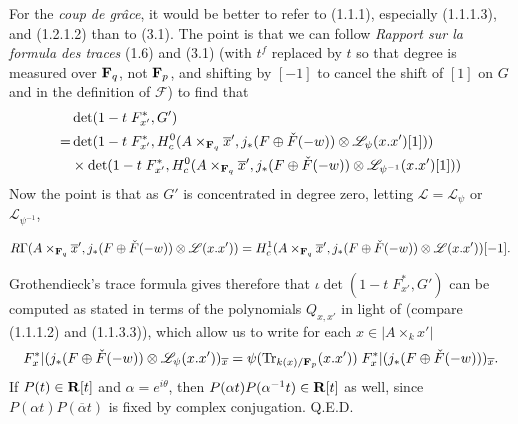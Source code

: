 \documentclass[deligne.tex]{subfiles}
\begin{document}
For the \emph{coup de grâce}, it would be better to refer to (1.1.1),
especially (1.1.1.3), and (1.2.1.2) than to (3.1). The point is that we
can follow \emph{Rapport sur la formula des traces} (1.6) and (3.1) (with
$t^f$ replaced by $t$ so that degree is measured over $\mathbf{F}_q$, not $\mathbf{F}_p$,
and shifting by $[-1]$ to cancel the shift of $[1]$ on $G$ and
in the definition of $\mathscr F$)
to find that
\begin{align*}
	&\det(1-t\; F_{x'}^*,G') \\
	=&\det(1-t\; F_{x'}^*,H_c^0(A\times_{\mathbf{F}_q}\overline x',j_*(F\oplus\check F(-w))\otimes\mathscr L_\psi(x.x')[1])) \\
	&\times\det(1-t\; F_{x'}^*,H_c^0(A\times_{\mathbf{F}_q}\overline x',j_*(F\oplus\check F(-w))\otimes\mathscr L_{\psi^{-1}}(x.x')[1]))
\end{align*}
Now the point is that as $G'$ is concentrated in degree zero,
letting $\mathscr L=\mathscr L_\psi$ or $\mathscr L_{\psi^{-1}}$,
\begin{ceqn}\begin{equation*}
	R\Gamma(A\times_{\mathbf{F}_q}\overline x',j_*(F\oplus\check F(-w))\otimes\mathscr L(x.x'))
	=H^1_c(A\times_{\mathbf{F}_q}\overline x',j_*(F\oplus\check F(-w))\otimes\mathscr L(x.x'))[-1].
\end{equation*}\end{ceqn}
Grothendieck's trace formula gives therefore that
$\iota\det(1-t\; F_{x'}^*,G')$ can be computed as stated in terms of the
polynomials $Q_{x,x'}$ in light of \cite[1.7.6 \& 1.7.7]{Trig}
(compare (1.1.1.2) and (1.1.3.3)), which allow us
to write for each $x\in|A\times_k x'|$
\begin{equation*}
	F_x^*|(j_*(F\oplus\check F(-w))\otimes\mathscr L_\psi(x.x'))_{\overline x}
	=\psi(\operatorname{Tr}_{k(x)/\mathbf{F}_p}(x.x'))\;F_x^*|(j_*(F\oplus\check F(-w)))_{\overline x}.
\end{equation*}
If $P(t)\in\mathbf{R}[t]$ and $\alpha=e^{i\theta}$, then
$P(\alpha t)P(\alpha^{-1}t)\in\mathbf{R}[t]$ as well, since
$P(\alpha t)P(\overline\alpha t)$ is fixed by complex conjugation.
\vfill\flushright Q.E.D.
\end{document}

